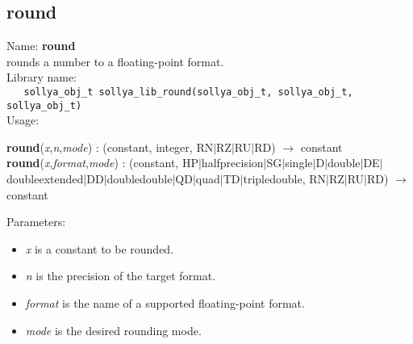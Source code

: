 \subsection{round}
\label{labround}
\noindent Name: \textbf{round}\\
\phantom{aaa}rounds a number to a floating-point format.\\[0.2cm]
\noindent Library name:\\
\verb|   sollya_obj_t sollya_lib_round(sollya_obj_t, sollya_obj_t, sollya_obj_t)|\\[0.2cm]
\noindent Usage: 
\begin{center}
\textbf{round}(\emph{x},\emph{n},\emph{mode}) : (\textsf{constant}, \textsf{integer}, \textsf{RN$|$RZ$|$RU$|$RD}) $\rightarrow$ \textsf{constant}\\
\textbf{round}(\emph{x},\emph{format},\emph{mode}) : (\textsf{constant}, \textsf{HP$|$halfprecision$|$SG$|$single$|$D$|$double$|$DE$|$doubleextended$|$DD$|$doubledouble$|$QD$|$quad$|$TD$|$tripledouble}, \textsf{RN$|$RZ$|$RU$|$RD}) $\rightarrow$ \textsf{constant}\\
\end{center}
Parameters: 
\begin{itemize}
\item \emph{x} is a constant to be rounded.
\item \emph{n} is the precision of the target format.
\item \emph{format} is the name of a supported floating-point format.
\item \emph{mode} is the desired rounding mode.
\end{itemize}
